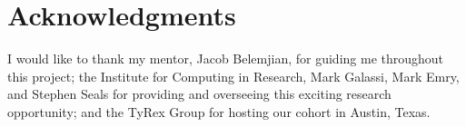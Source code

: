 \documentclass{paper}
\begin{document}
\section{Acknowledgments}
I would like to thank my mentor, Jacob Belemjian, for guiding me throughout this project; the Institute for Computing in Research, Mark Galassi, Mark Emry, and Stephen Seals for providing and overseeing this exciting research opportunity; and the TyRex Group for hosting our cohort in Austin, Texas.



\nocite{*}
\end{document}
